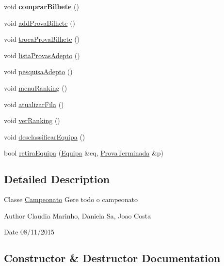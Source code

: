 \begin{DoxyCompactItemize}
\item 
\hypertarget{class_campeonato_af8b03f9a0a5d6795df8ffcfda493a0a4}{}void {\bfseries comprar\+Bilhete} ()\label{class_campeonato_af8b03f9a0a5d6795df8ffcfda493a0a4}

\item 
void \hyperlink{class_campeonato_a05e18e68428373c9df881519c94be4e7}{add\+Prova\+Bilhete} ()
\item 
void \hyperlink{class_campeonato_a716510c7dbc601de4e3531a94da758e8}{troca\+Prova\+Bilhete} ()
\item 
void \hyperlink{class_campeonato_a08d9829bea8bd4911b14f76a865cdaed}{lista\+Provas\+Adepto} ()
\item 
void \hyperlink{class_campeonato_a5e124719cfc7b2f732a29bf65cc1f5a0}{pesquisa\+Adepto} ()
\item 
void \hyperlink{class_campeonato_afa21d8dac5d1a9c9a495f9d2631271c7}{menu\+Ranking} ()
\item 
void \hyperlink{class_campeonato_aaed98648ff163277d55d00b312699fef}{atualizar\+Fila} ()
\item 
void \hyperlink{class_campeonato_aa0137184d2632bdb124f5c9228959cf0}{ver\+Ranking} ()
\item 
void \hyperlink{class_campeonato_a9b5d6cd5004bf7b4f19f9cb412242c96}{desclassificar\+Equipa} ()
\item 
bool \hyperlink{class_campeonato_a61cd7711c1eeddc512c460cc0a66e64e}{retira\+Equipa} (\hyperlink{class_equipa}{Equipa} \&eq, \hyperlink{class_prova_terminada}{Prova\+Terminada} \&p)
\end{DoxyCompactItemize}


\subsection{Detailed Description}
Classe \hyperlink{class_campeonato}{Campeonato} Gere todo o campeonato

\begin{DoxyAuthor}{Author}
Claudia Marinho, Daniela Sa, Joao Costa 
\end{DoxyAuthor}
\begin{DoxyDate}{Date}
08/11/2015 
\end{DoxyDate}


\subsection{Constructor \& Destructor Documentation}
\hypertarget{class_campeonato_a1768952d93666c042f3548b1dd88969d}{}
